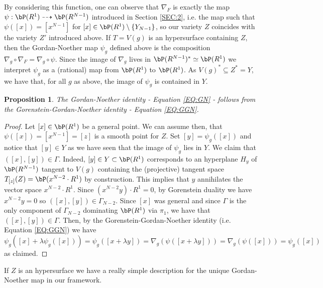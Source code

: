 \documentclass[a4paper,11pt]{amsart}
\newtheorem{proposition}[theorem]{Proposition}
\begin{document}
By considering this function, one can observe that $\nabla_F$ is exactly the map $\psi:\bP(R^1)\dashrightarrow \bP(R^{N-1})$ introduced in Section \ref{SEC:2}, i.e. the map such that $\psi([x])=[x^{N-1}]$ for $[x]\in \bP(R^1)\setminus\{Y_{N-1}\}$, so our variety $Z$ coincides with the variety $Z'$ introduced above. If $T=V(g)$ is an hypersurface containing $Z$, then the Gordan-Noether map $\psi_g$ defined above is the composition $\nabla_g\circ \nabla_F=\nabla_g\circ \psi$. Since the image of $\nabla_g$ lives in $\bP(R^{N-1})^*\simeq \bP(R^1)$ we interpret $\psi_g$ as a (rational) map from $\bP(R^1)$ to $\bP(R^1)$. As $V(g)^*\subseteq Z^*=Y$, we have that, for all $g$ as above, the image of $\psi_g$ is contained in $Y$.

\begin{proposition}
The Gordan-Noether identity - Equation \eqref{EQ:GN} - follows from the Gorenstein-Gordan-Noether identity - Equation \eqref{EQ:GGN}.
\end{proposition}

\begin{proof}
Let $[x]\in \bP(R^1)$ be a general point. We can assume then, that $\psi([x])=[x^{N-1}]=[z]$ is a smooth point for $Z$. Set $[y]=\psi_g([x])$ and notice that $[y]\in Y$ as we have seen that the image of $\psi_g$ lies in $Y$. We claim that $([x],[y])\in \Gamma$. Indeed, $[y]\in Y\subset \bP(R^1)$ corresponds to an hyperplane $H_y$ of $\bP(R^{N-1})$ tangent to $V(g)$ containing the (projective) tangent space $T_{[z]}(Z)=\bP(x^{N-2}\cdot R^1)$ by construction. This implies that $y$ annihilates the vector space $x^{N-2}\cdot R^1$. Since $(x^{N-2}y)\cdot R^1=0$, by Gorenstein duality we have $x^{N-2}y=0$ so $([x],[y])\in \Gamma_{N-2}$. Since $[x]$ was general and since $\Gamma$ is the only component of $\Gamma_{N-2}$ dominating $\bP(R^1)$ via $\pi_1$, we have that $([x],[y])\in \Gamma$. Then, by the Gorenstein-Gordan-Noether identity (i.e. Equation \eqref{EQ:GGN}) we have
$$\psi_g([x]+\lambda\psi_g([x]))=\psi_g([x+\lambda y])=\nabla_g(\psi([x+\lambda y]))=\nabla_g(\psi([x]))=\psi_g([x])$$
as claimed.
\end{proof}

If $Z$ is an hypersurface we have a really simple description for the unique Gordan-Noether map in our framework.
\end{document}
